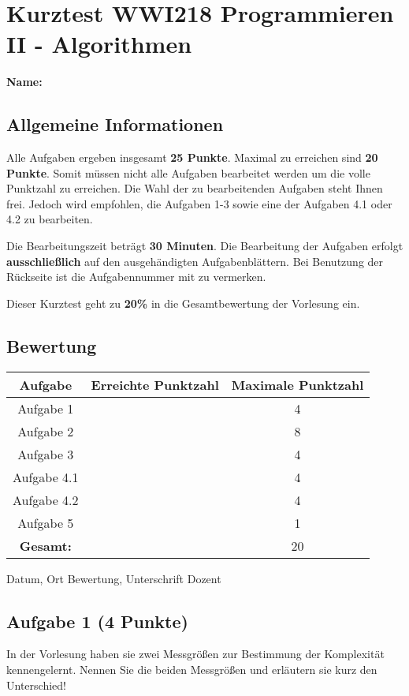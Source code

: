 \documentclass[a4paper,
			   fontsize=12pt]{article}
\begin{document}
\section*{Kurztest WWI218 Programmieren II - Algorithmen}
\textbf{Name:} 
\vspace{0,5cm}
\subsection*{Allgemeine Informationen}
Alle Aufgaben ergeben insgesamt \textbf{25 Punkte}. Maximal zu erreichen sind \textbf{20 Punkte}. Somit müssen nicht alle Aufgaben bearbeitet werden um die volle Punktzahl zu erreichen.
Die Wahl der zu bearbeitenden Aufgaben steht Ihnen frei. Jedoch wird empfohlen, die Aufgaben 1-3 sowie eine der Aufgaben 4.1 oder 4.2 zu bearbeiten.

Die Bearbeitungszeit beträgt \textbf{30 Minuten}. Die Bearbeitung der Aufgaben erfolgt \textbf{ausschließlich} auf den ausgehändigten Aufgabenblättern. Bei Benutzung der Rückseite ist die Aufgabennummer mit zu vermerken.

Dieser Kurztest geht zu \textbf{20\%} in die Gesamtbewertung der Vorlesung ein.

\subsection*{Bewertung}
\begin{tabular}{|c|c|c|}
\hline
\textbf{Aufgabe}&\textbf{Erreichte Punktzahl}&\textbf{Maximale Punktzahl}\\
\hline
Aufgabe 1 & & 4
\\\hline
Aufgabe 2 & & 8
\\\hline
Aufgabe 3 & & 4
\\\hline
Aufgabe 4.1 & & 4
\\\hline
Aufgabe 4.2 & & 4
\\\hline
Aufgabe 5 & & 1
\\\hline
\textbf{Gesamt:} & & 20
\\\hline
\end{tabular}

\vspace{2cm}
\hline


\small{Datum, Ort \hspace{8cm} Bewertung, Unterschrift Dozent}

\newpage

\subsection*{Aufgabe 1 (4 Punkte)}
In der Vorlesung haben sie zwei Messgrößen zur Bestimmung der Komplexität kennengelernt. Nennen Sie die beiden Messgrößen und erläutern sie kurz den Unterschied!
\end{document}
